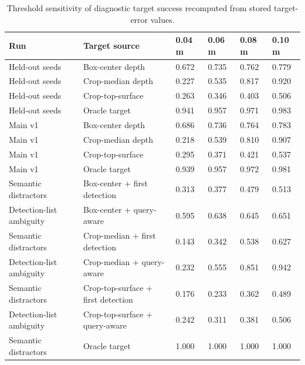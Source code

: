 \begin{table}[t]
\centering
\caption{Threshold sensitivity of diagnostic target success recomputed from stored target-error values.}
\label{tab:threshold-sensitivity}
\small
\begin{tabular}{llllll}
\hline
Run & Target source & 0.04 m & 0.06 m & 0.08 m & 0.10 m \\
\hline
Held-out seeds & Box-center depth & 0.672 & 0.735 & 0.762 & 0.779 \\
Held-out seeds & Crop-median depth & 0.227 & 0.535 & 0.817 & 0.920 \\
Held-out seeds & Crop-top-surface & 0.263 & 0.346 & 0.403 & 0.506 \\
Held-out seeds & Oracle target & 0.941 & 0.957 & 0.971 & 0.983 \\
Main v1 & Box-center depth & 0.686 & 0.736 & 0.764 & 0.783 \\
Main v1 & Crop-median depth & 0.218 & 0.539 & 0.810 & 0.907 \\
Main v1 & Crop-top-surface & 0.295 & 0.371 & 0.421 & 0.537 \\
Main v1 & Oracle target & 0.939 & 0.957 & 0.972 & 0.981 \\
Semantic distractors & Box-center + first detection & 0.313 & 0.377 & 0.479 & 0.513 \\
Detection-list ambiguity & Box-center + query-aware & 0.595 & 0.638 & 0.645 & 0.651 \\
Semantic distractors & Crop-median + first detection & 0.143 & 0.342 & 0.538 & 0.627 \\
Detection-list ambiguity & Crop-median + query-aware & 0.232 & 0.555 & 0.851 & 0.942 \\
Semantic distractors & Crop-top-surface + first detection & 0.176 & 0.233 & 0.362 & 0.489 \\
Detection-list ambiguity & Crop-top-surface + query-aware & 0.242 & 0.311 & 0.381 & 0.506 \\
Semantic distractors & Oracle target & 1.000 & 1.000 & 1.000 & 1.000 \\
\hline
\end{tabular}
\end{table}
